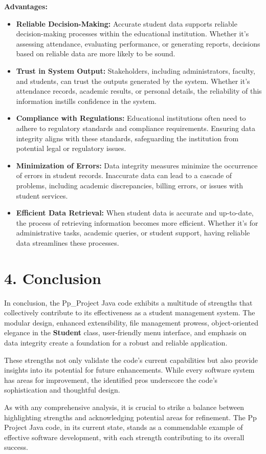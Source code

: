 \documentclass{article}
\begin{document}
\textbf{Advantages:}
\begin{itemize}
    \item \textbf{Reliable Decision-Making:} Accurate student data supports reliable decision-making processes within the educational institution. 
    Whether it's assessing attendance, evaluating performance, or generating reports, decisions based on reliable data are more likely to be sound.
    \item \textbf{Trust in System Output:} Stakeholders, including administrators, faculty, and students, can trust the outputs generated by the system. 
    Whether it's attendance records, academic results, or personal details, the reliability of this information instills confidence in the system.
    \item \textbf{Compliance with Regulations:} Educational institutions often need to adhere to regulatory standards and compliance requirements. 
    Ensuring data integrity aligns with these standards, safeguarding the institution from potential legal or regulatory issues.
    \item \textbf{Minimization of Errors:} Data integrity measures minimize the occurrence of errors in student records. 
    Inaccurate data can lead to a cascade of problems, including academic discrepancies, billing errors, or issues with student services.
    \item \textbf{Efficient Data Retrieval:} When student data is accurate and up-to-date, the process of retrieving information becomes more efficient. 
    Whether it's for administrative tasks, academic queries, or student support, having reliable data streamlines these processes.
\end{itemize}

\section*{\textbf{\textbf{4. Conclusion}}}

In conclusion, the Pp\_Project Java code exhibits a multitude of strengths that collectively contribute to its effectiveness as a student management system. 
The modular design, enhanced extensibility, file management prowess, object-oriented elegance in the \textbf{Student} class, user-friendly menu interface, 
and emphasis on data integrity create a foundation for a robust and reliable application.

These strengths not only validate the code's current capabilities but also provide insights into its potential for future enhancements. 
While every software system has areas for improvement, the identified pros underscore the code's sophistication and thoughtful design.

As with any comprehensive analysis, it is crucial to strike a balance between highlighting strengths and acknowledging potential areas for refinement. 
The Pp Project Java code, in its current state, stands as a commendable example of effective software development, with each strength contributing to its overall success.
\end{document}
